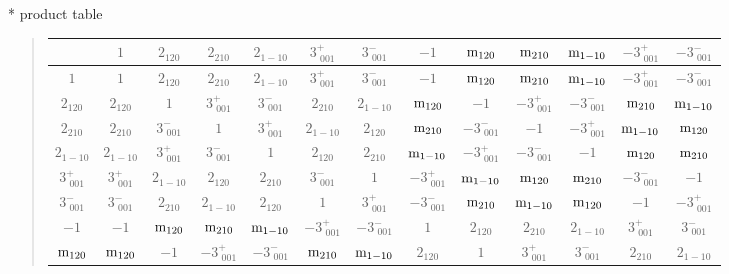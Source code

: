 \documentclass[fleqn,10pt,landscape]{jsarticle}
\begin{document}
* product table
\begin{quote}
\begin{tabular}{ccccccccccccc} \hline \hline
 & $ 1 $ & $ 2{}_{120} $ & $ 2{}_{210} $ & $ 2{}_{1-10} $ & $ 3^{+}_{\,\,001} $ & $ 3^{-}_{\,\,001} $ & $ -1 $ & $ {\rm m}_{120} $ & $ {\rm m}_{210} $ & $ {\rm m}_{1-10} $ & $ -3^{+}_{\,\,001} $ & $ -3^{-}_{\,\,001} $ \\ \hline
$ 1 $ & $ 1 $ & $ 2{}_{120} $ & $ 2{}_{210} $ & $ 2{}_{1-10} $ & $ 3^{+}_{\,\,001} $ & $ 3^{-}_{\,\,001} $ & $ -1 $ & $ {\rm m}_{120} $ & $ {\rm m}_{210} $ & $ {\rm m}_{1-10} $ & $ -3^{+}_{\,\,001} $ & $ -3^{-}_{\,\,001} $ \\
$ 2{}_{120} $ & $ 2{}_{120} $ & $ 1 $ & $ 3^{+}_{\,\,001} $ & $ 3^{-}_{\,\,001} $ & $ 2{}_{210} $ & $ 2{}_{1-10} $ & $ {\rm m}_{120} $ & $ -1 $ & $ -3^{+}_{\,\,001} $ & $ -3^{-}_{\,\,001} $ & $ {\rm m}_{210} $ & $ {\rm m}_{1-10} $ \\
$ 2{}_{210} $ & $ 2{}_{210} $ & $ 3^{-}_{\,\,001} $ & $ 1 $ & $ 3^{+}_{\,\,001} $ & $ 2{}_{1-10} $ & $ 2{}_{120} $ & $ {\rm m}_{210} $ & $ -3^{-}_{\,\,001} $ & $ -1 $ & $ -3^{+}_{\,\,001} $ & $ {\rm m}_{1-10} $ & $ {\rm m}_{120} $ \\
$ 2{}_{1-10} $ & $ 2{}_{1-10} $ & $ 3^{+}_{\,\,001} $ & $ 3^{-}_{\,\,001} $ & $ 1 $ & $ 2{}_{120} $ & $ 2{}_{210} $ & $ {\rm m}_{1-10} $ & $ -3^{+}_{\,\,001} $ & $ -3^{-}_{\,\,001} $ & $ -1 $ & $ {\rm m}_{120} $ & $ {\rm m}_{210} $ \\
$ 3^{+}_{\,\,001} $ & $ 3^{+}_{\,\,001} $ & $ 2{}_{1-10} $ & $ 2{}_{120} $ & $ 2{}_{210} $ & $ 3^{-}_{\,\,001} $ & $ 1 $ & $ -3^{+}_{\,\,001} $ & $ {\rm m}_{1-10} $ & $ {\rm m}_{120} $ & $ {\rm m}_{210} $ & $ -3^{-}_{\,\,001} $ & $ -1 $ \\
$ 3^{-}_{\,\,001} $ & $ 3^{-}_{\,\,001} $ & $ 2{}_{210} $ & $ 2{}_{1-10} $ & $ 2{}_{120} $ & $ 1 $ & $ 3^{+}_{\,\,001} $ & $ -3^{-}_{\,\,001} $ & $ {\rm m}_{210} $ & $ {\rm m}_{1-10} $ & $ {\rm m}_{120} $ & $ -1 $ & $ -3^{+}_{\,\,001} $ \\
$ -1 $ & $ -1 $ & $ {\rm m}_{120} $ & $ {\rm m}_{210} $ & $ {\rm m}_{1-10} $ & $ -3^{+}_{\,\,001} $ & $ -3^{-}_{\,\,001} $ & $ 1 $ & $ 2{}_{120} $ & $ 2{}_{210} $ & $ 2{}_{1-10} $ & $ 3^{+}_{\,\,001} $ & $ 3^{-}_{\,\,001} $ \\
$ {\rm m}_{120} $ & $ {\rm m}_{120} $ & $ -1 $ & $ -3^{+}_{\,\,001} $ & $ -3^{-}_{\,\,001} $ & $ {\rm m}_{210} $ & $ {\rm m}_{1-10} $ & $ 2{}_{120} $ & $ 1 $ & $ 3^{+}_{\,\,001} $ & $ 3^{-}_{\,\,001} $ & $ 2{}_{210} $ & $ 2{}_{1-10} $ \\

\end{tabular}
\end{quote}
\end{document}
